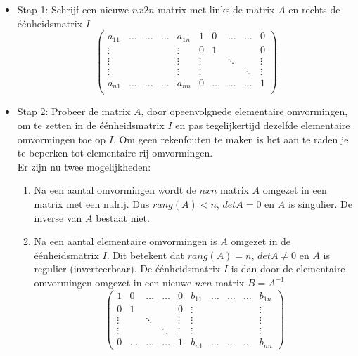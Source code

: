 \begin{itemize}
	\item Stap 1: Schrijf een nieuwe $nx2n$ matrix met links de matrix $A$ en rechts de \'{e}\'{e}nheidsmatrix $I$
	\[ \left( \begin{matrix}
	a_{11} & \ldots & \ldots & \ldots & a_{1n} & 1 & 0 & \ldots & \ldots & 0 \\
	\vdots &  &  &  & \vdots  & 0 & 1 &  &  &  0 \\
	\vdots &  &  &  & \vdots & \vdots &  & \ddots &  & \vdots\\
	\vdots &  &  &  & \vdots & \vdots &  &  & \ddots & \vdots \\
	a_{n1} & \ldots & \ldots & \ldots & a_{nn} & 0 & \ldots & \ldots & \ldots & 1  \\
	\end{matrix} \right) \] 
	\item Stap 2: Probeer de matrix $A$, door opeenvolgnede elementaire omvormingen, om te zetten in de \'{e}\'{e}nheidsmatrix $I$ en pas tegelijkertijd dezelfde elementaire omvormingen toe op $I$. Om geen rekenfouten te maken is het aan te raden je te beperken tot elementaire rij-omvormingen.\\
	Er zijn nu twee mogelijkheden:
	\begin{enumerate}
		\item Na een aantal omvormingen wordt de $nxn$ matrix $A$ omgezet in een matrix met een nulrij. Dus $rang(A)<n$, $detA=0$ en $A$ is singulier. De inverse van $A$ bestaat niet.
		\item Na een aantal elementaire omvormingen is $A$ omgezet in de \'{e}\'{e}nheidsmatrix $I$. Dit betekent dat $rang(A)=n$, $detA \neq 0$ en $A$ is regulier (inverteerbaar). De \'{e}\'{e}nheidsmatrix $I$ is dan door de elementaire omvormingen omgezet in een nieuwe $nxn$ matrix $B=A^{-1}$
		\[  \left( \begin{matrix}
		1 & 0 & \ldots & \ldots & 0 & b_{11} & \ldots & \ldots & \ldots & b_{1n} \\
		0 & 1 &  &  &  0 & \vdots & & & & \vdots \\
		\vdots &  & \ddots & & \vdots & \vdots &  &  &  & \vdots \\
		\vdots &  &  & \ddots & \vdots & \vdots & & & & \vdots \\
		0 & \ldots & \ldots & \ldots & 1 & b_{n1} & \ldots & \ldots & \ldots & b_{nn} \end{matrix} \right) 
		\]
	\end{enumerate}
\end{itemize}

